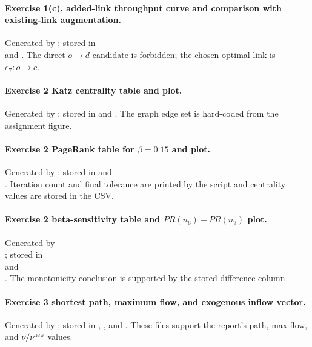\documentclass[11pt,a4paper]{article}
\begin{document}
\paragraph{Exercise 1(c), added-link throughput curve and comparison with existing-link augmentation.}
Generated by ; stored in \\  and . The direct $o\to d$ candidate is forbidden; the chosen optimal link is $e_7:o\to c$.

\paragraph{Exercise 2 Katz centrality table and plot.}
Generated by ; stored in  and . The graph edge set is hard-coded from the assignment figure.

\paragraph{Exercise 2 PageRank table for $\beta=0.15$ and plot.}
Generated by ; stored in  and \\ . Iteration count and final tolerance are printed by the script and centrality values are stored in the CSV.

\paragraph{Exercise 2 beta-sensitivity table and $PR(n_6)-PR(n_9)$ plot.} 
 Generated by \\ ; stored in \\  and \\ . The monotonicity conclusion is supported by the stored difference column

\paragraph{Exercise 3 shortest path, maximum flow, and exogenous inflow vector.}
Generated by ; stored in , , and . These files support the report's path, max-flow, and $\nu/\nu^{\mathrm{new}}$ values.
\end{document}
